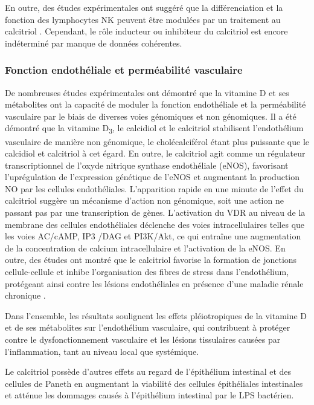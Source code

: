 \documentclass[
  a4paper,
  DIV=11,
  numbers=noendperiod,
  listof=totoc]{scrreprt}
\begin{document}
En outre, des études expérimentales ont suggéré que la différenciation
et la fonction des lymphocytes \ac{NK} peuvent être modulées par un
traitement au calcitriol \autocite{Charoenngam.2020}. Cependant, le rôle
inducteur ou inhibiteur du calcitriol est encore indéterminé par manque
de données cohérentes.

\hypertarget{fonction-endothuxe9liale-et-permuxe9abilituxe9-vasculaire}{%
\subsubsection{Fonction endothéliale et perméabilité
vasculaire}\label{fonction-endothuxe9liale-et-permuxe9abilituxe9-vasculaire}}

De nombreuses études expérimentales ont démontré que la vitamine D et
ses métabolites ont la capacité de moduler la fonction endothéliale et
la perméabilité vasculaire par le biais de diverses voies génomiques et
non génomiques. Il a été démontré que la vitamine D\textsubscript{3}, le
calcidiol et le calcitriol stabilisent l'endothélium vasculaire de
manière non génomique, le cholécalciférol étant plus puissante que le
calcidiol et calcitriol à cet égard. En outre, le calcitriol agit comme
un régulateur transcriptionnel de l'oxyde nitrique synthase endothéliale
(\acs{eNOS}), favorisant l'uprégulation de l'expression
génétique de l'\ac{eNOS} et augmentant la production NO par les cellules
endothéliales. L'apparition rapide en une minute de l'effet du
calcitriol suggère un mécanisme d'action non génomique, soit une action
ne passant pas par une transcription de gènes. L'activation du \ac{VDR}
au niveau de la membrane des cellules endothéliales déclenche des voies
intracellulaires telles que les voies AC/cAMP, IP3 /DAG et PI3K/Akt, ce
qui entraîne une augmentation de la concentration de calcium
intracellulaire et l'activation de la \ac{eNOS}. En outre, des études
ont montré que le calcitriol favorise la formation de jonctions
cellule-cellule et inhibe l'organisation des fibres de stress dans
l'endothélium, protégeant ainsi contre les lésions endothéliales en
présence d'une maladie rénale chronique \autocite{Charoenngam.2020}.

Dans l'ensemble, les résultats soulignent les effets pléiotropiques de
la vitamine D et de ses métabolites sur l'endothélium vasculaire, qui
contribuent à protéger contre le dysfonctionnement vasculaire et les
lésions tissulaires causées par l'inflammation, tant au niveau local que
systémique.

Le calcitriol possède d'autres effets au regard de l'épithélium
intestinal et des cellules de Paneth en augmentant la viabilité des
cellules épithéliales intestinales et atténue les dommages causés à
l'épithélium intestinal par le \ac{LPS} bactérien.
\end{document}
